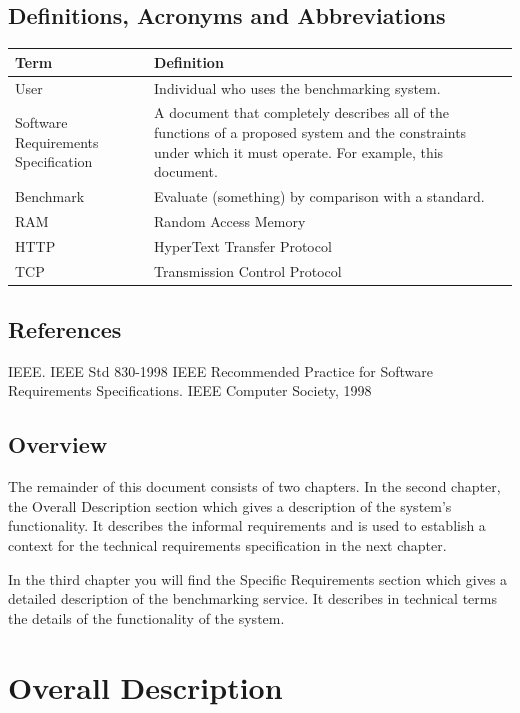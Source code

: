 \documentclass[a4paper,12pt]{article}
\begin{document}
\subsection{Definitions, Acronyms and Abbreviations}
\begin{center}
\begin{tabular}{ |p{5cm}|p{10cm}| } 
\hline
Term & Definition \\ 
\hline
User & Individual who uses the benchmarking system. \\ 
\hline
Software Requirements Specification & A document that completely describes all of the functions of a proposed system and the constraints under which it must operate. For example, this document. \\ 
\hline
Benchmark & Evaluate (something) by comparison with a standard. \\
\hline
RAM & Random Access Memory  \\
\hline
HTTP & HyperText Transfer Protocol \\
\hline
TCP & Transmission Control Protocol\\
\hline
\end{tabular}
\end{center}

\subsection{References}
IEEE. IEEE Std 830-1998 IEEE Recommended Practice for Software Requirements Specifications. IEEE Computer Society, 1998

\subsection{Overview}
The remainder of this document consists of two chapters. In the second chapter, the Overall Description section which gives a description of the system's functionality. It describes the informal requirements and is used to establish a context for the technical requirements specification in the next chapter.

In the third chapter you will find the Specific Requirements section which gives a detailed description of the benchmarking service. It describes in technical terms the details of the functionality of the system.

\section{Overall Description}
\end{document}
